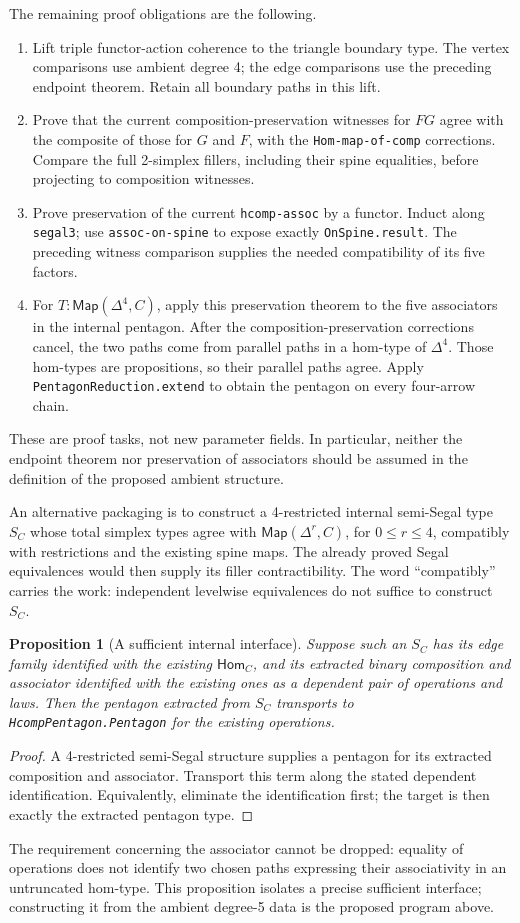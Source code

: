 \documentclass[11pt]{amsart}
\newcommand{\Map}{\mathsf{Map}}
\newcommand{\Hom}{\mathsf{Hom}}
\newcommand{\code}[1]{\nolinkurl{#1}}
\newtheorem{proposition}{Proposition}
\theoremstyle{definition}
\begin{document}
The remaining proof obligations are the following.
\begin{enumerate}
\item Lift triple functor-action coherence to the triangle boundary
type. The vertex comparisons use ambient degree 4; the edge
comparisons use the preceding endpoint theorem. Retain all boundary
paths in this lift.
\item Prove that the current composition-preservation witnesses for
$FG$ agree with the composite of those for $G$ and $F$, with the
\code{Hom-map-of-comp} corrections. Compare the full 2-simplex
fillers, including their spine equalities, before projecting to
composition witnesses.
\item Prove preservation of the current \code{hcomp-assoc} by a
functor. Induct along \code{segal3}; use
\code{assoc-on-spine} to expose exactly \code{OnSpine.result}.
The preceding witness comparison supplies the needed compatibility
of its five factors.
\item For $T:\Map(\Delta^4,C)$, apply this preservation theorem to
the five associators in the internal pentagon. After the
composition-preservation corrections cancel, the two paths come
from parallel paths in a hom-type of $\Delta^4$. Those hom-types
are propositions, so their parallel paths agree. Apply
\code{PentagonReduction.extend} to obtain the pentagon on every
four-arrow chain.
\end{enumerate}
These are proof tasks, not new parameter fields. In particular, neither
the endpoint theorem nor preservation of associators should be assumed
in the definition of the proposed ambient structure.

An alternative packaging is to construct a 4-restricted internal
semi-Segal type $S_C$ whose total simplex types agree with
$\Map(\Delta^r,C)$, for $0\leq r\leq4$, compatibly with restrictions
and the existing spine maps. The already proved Segal equivalences
would then supply its filler contractibility. The word
``compatibly'' carries the work: independent levelwise equivalences
do not suffice to construct $S_C$.

\begin{proposition}[A sufficient internal interface]
Suppose such an $S_C$ has its edge family identified with the existing
$\Hom_C$, and its extracted binary composition and associator identified
with the existing ones as a dependent pair of operations and laws.
Then the pentagon extracted from $S_C$ transports to
\code{HcompPentagon.Pentagon} for the existing operations.
\end{proposition}
\begin{proof}
A 4-restricted semi-Segal structure supplies a pentagon for its extracted
composition and associator. Transport this term along the stated
dependent identification. Equivalently, eliminate the identification
first; the target is then exactly the extracted pentagon type.
\end{proof}
The requirement concerning the associator cannot be dropped: equality
of operations does not identify two chosen paths expressing their
associativity in an untruncated hom-type. This proposition isolates
a precise sufficient interface; constructing it from the ambient
degree-5 data is the proposed program above.
\end{document}
